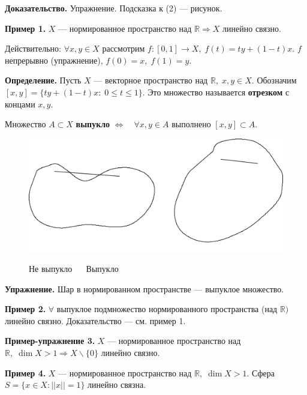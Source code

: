 \documentclass[12pt,a4paper]{article}
\begin{document}
\textbf{Доказательство.} Упражнение. Подсказка к (2) --- рисунок.

\textbf{Пример 1.} $X$ --- нормированное пространство над $\mathbb{R} \Rightarrow X$ линейно связно. 

Действительно: $\forall x, y \in X$ рассмотрим $f: [0, 1] \to X, \; f(t) = ty + (1 - t)x.$ $f$ непрерывно (упражнение), $f(0) = x, \; f(1) = y.$

\textbf{Определение.} Пусть $X$ --- векторное пространство над $\mathbb{R}, \; x, y \in X.$ Обозначим $[x, y] = \{ty + (1 - t)x\!\!: \; 0 \leq t  \leq 1\}.$ Это множество называется \textbf{отрезком} с концами $x, y.$ 

Множество $A \subset X$ \textbf{выпукло} $\Leftrightarrow \quad \forall x, y \in A$ выполнено $[x, y] \subset A.$ 

\begin{figure}
	\;
	\includegraphics[width=0.8\linewidth]{lect8_6.png}
	
	\; Не выпукло $\quad$ Выпукло
\end{figure}

\textbf{Упражнение.} Шар в нормированном пространстве --- выпуклое множество. 

\textbf{Пример 2.} $\forall$ выпуклое подмножество нормированного пространства (над $\mathbb{R})$ линейно связно. Доказательство --- см. пример 1. 

\textbf{Пример-упражнение 3.} $X$ --- нормированное пространство над $\mathbb{R}, \; \dim X > 1 \Rightarrow X \backslash \{0\}$ линейно связно. 

\textbf{Пример 4.} $X$ --- нормированное пространство над $\mathbb{R}, \; \dim X > 1.$ Сфера $S = \{x \in X\!\!: ||x|| =  1\}$ линейно связна. 

\begin{figure}
\end{figure}
\end{document}
